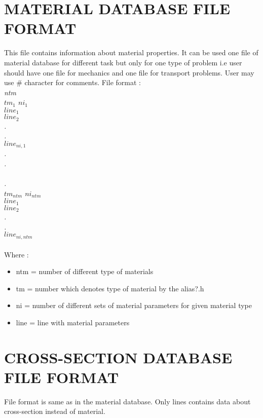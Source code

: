 \documentclass[12pt]{book}
\begin{document}
\section {MATERIAL DATABASE FILE FORMAT}
This file contains information about material properties. It can be used one
file of material database for different task but only for one type of problem i.e user
should have one file for mechanics and one file for transport problems.
User may use \# character for comments.
File format :\\
{\it
ntm\\
$tm_1$ $ni_1$\\
$line_1$\\
$line_2$\\
.\\
.\\
$line_{ni,1}$\\
.\\
.\\ \\

.\\
$tm_{ntm}$ $ni_{ntm}$\\
$line_1$\\
$line_2$\\
.\\
.\\
$line_{ni,ntm}$\\\\
}
Where :
\begin{itemize}
\item ntm  = number of different type of materials
\item tm   = number which denotes type of material by the alias?.h
\item ni   = number of different sets of material parameters for given material type
\item line = line with material parameters
\end{itemize}

\section {CROSS-SECTION DATABASE FILE FORMAT}
File format is same as in the material database. Only lines contains data about
cross-section instead of material.
\end{document}
